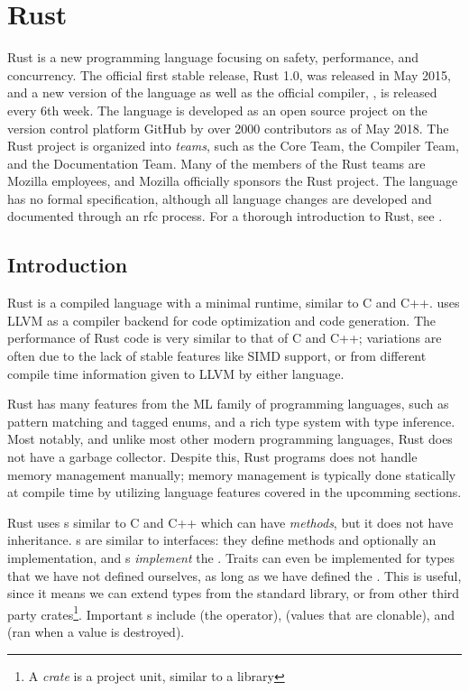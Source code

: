 \chapter{Rust\label{ch:rust}}


Rust is a new programming language focusing on safety, performance, and concurrency\cite{rust}.
The official first stable release, Rust 1.0, was released in May 2015, and a new version of the
language as well as the official compiler, , is released every 6th week. The language
is developed as an open source project on the version control platform GitHub\cite{github} by over
2000 contributors as of May 2018\cite{rust-github}. The Rust project is organized into
\emph{teams}, such as the Core Team, the Compiler Team, and the Documentation Team. Many of the
members of the Rust teams are Mozilla employees, and Mozilla officially sponsors the Rust project.
The language has no formal specification, although all language changes are developed and
documented through an \gls{rfc} process. For a thorough introduction to Rust, see \cite{trpl}.


\section{Introduction}

Rust is a compiled language with a minimal runtime, similar to C and C++.  uses
LLVM\cite{llvm} as a compiler backend for code optimization and code generation. The performance of
Rust code is very similar to that of C and C++\cite{rust-perf}; variations are often due to the
lack of stable features like SIMD support, or from different compile time information given to LLVM
by either language.

Rust has many features from the ML family of programming languages, such as pattern matching and
tagged enums, and a rich type system with type inference. Most notably, and unlike most other
modern programming languages, Rust does not have a garbage collector. Despite this, Rust programs
does not handle memory management manually; memory management is typically done statically at
compile time by utilizing language features covered in the upcomming sections.

Rust uses s similar to C and C++ which can have \emph{methods}, but it does not have
inheritance. s are similar to interfaces: they define methods and optionally an
implementation, and s \emph{implement} the . Traits can even be
implemented for types that we have not defined ourselves, as long as we have defined the
. This is useful, since it means we can extend types from the standard library, or from
other third party crates\footnote{A \emph{crate} is a project unit, similar to a library}.
Important s include  (the \code{*} operator),  (values that are
clonable), and  (ran when a value is destroyed).

